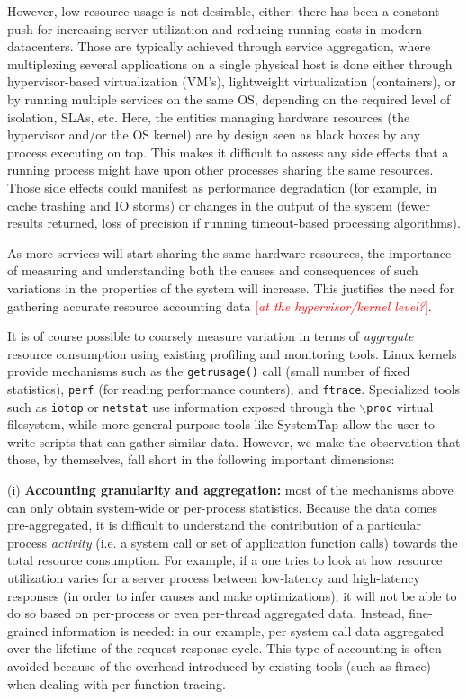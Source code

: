 \documentclass[letterpaper,twocolumn,10pt]{article}
\newcommand{\lnote}[1]{\textcolor{red}{[\textit{#1}]}} %
\begin{document}
However, low resource usage is not desirable, either: there has been a constant
push for increasing server utilization and reducing running costs in modern
datacenters. Those are typically achieved through service aggregation, where
multiplexing several applications on a single physical host is done either
through hypervisor-based virtualization (VM's), lightweight virtualization
(containers), or by running multiple services on the same OS, depending on the
required level of isolation, SLAs, etc. %
Here, the entities managing hardware resources (the hypervisor and/or the OS
kernel) are by design seen as black boxes by any process executing on top. This
makes it difficult to assess any side effects that a running process might have
upon other processes sharing the same resources. Those side effects could
manifest as performance degradation (for example, in cache trashing and IO
storms) or changes in the output of the system (fewer results returned, loss of
precision if running timeout-based processing algorithms).

As more services will start sharing the same hardware resources, the importance
of measuring and understanding both the causes and consequences of such
variations in the properties of the system will increase. This justifies the
need for gathering accurate resource accounting data \lnote{at the
hypervisor/kernel level?}.

It is of course possible to coarsely measure variation in terms of
\textit{aggregate} resource consumption using existing profiling and monitoring
tools. Linux kernels provide mechanisms such as the \texttt{getrusage()} call
(small number of fixed statistics), \texttt{perf} (for reading performance
counters), and \texttt{ftrace}. Specialized tools such as \texttt{iotop} or
\texttt{netstat} use information exposed through the \texttt{$\backslash$proc}
virtual filesystem, while more general-purpose tools like SystemTap allow the
user to write scripts that can gather similar data. However, we make the
observation that those, by themselves, fall short in the following important
dimensions:

(i) \textbf{Accounting granularity and aggregation:} most of the mechanisms
above can only obtain system-wide or per-process statistics. Because the data
comes pre-aggregated, it is difficult to understand the contribution of a
particular process \textit{activity} (i.e. a system call or set of application
function calls) towards the total resource consumption. For example, if a one
tries to look at how resource utilization varies for a server process between
low-latency and high-latency responses (in order to infer causes and make
optimizations), it will not be able to do so based on per-process or even
per-thread aggregated data. Instead, fine-grained information is needed: in our
example, per system call data aggregated over the lifetime of the
request-response cycle. This type of accounting is often avoided because of the
overhead introduced by existing tools (such as ftrace) when dealing with
per-function tracing.
\end{document}
